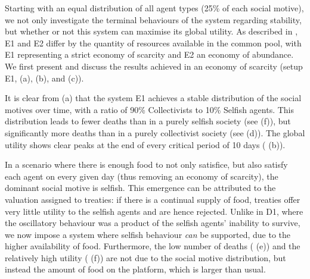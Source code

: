 

Starting with an equal distribution of all agent types (25\% of each social motive), we not only investigate the terminal behaviours of the system regarding stability, but whether or not this system can maximise its global utility. As described in , E1 and E2 differ by the quantity of resources available in the common pool, with E1 representing a strict economy of scarcity and E2 an economy of abundance. We first present and discuss the results achieved in an economy of scarcity (setup E1,  (a), (b), and (c)).

It is clear from  (a) that the system E1 achieves a stable distribution of the social motives over time, with a ratio of 90\% Collectivists to 10\% Selfish agents. This distribution leads to fewer deaths than in a purely selfish society (see  (f)), but significantly more deaths than in a purely collectivist society (see  (d)). The global utility shows clear peaks at the end of every critical period of 10 days ( (b)).

In a scenario where there is enough food to not only satisfice, but also satisfy each agent on every given day (thus removing an economy of scarcity), the dominant social motive is selfish. This emergence can be attributed to the valuation assigned to treaties: if there is a continual supply of food, treaties offer very little utility to the selfish agents and are hence rejected. Unlike in D1, where the oscillatory behaviour was a product of the selfish agents' inability to survive, we now impose a system where selfish behaviour \textit{can} be supported, due to the higher availability of food. Furthermore, the low number of deaths ( (e)) and the relatively high utility ( (f)) are not due to the social motive distribution, but instead the amount of food on the platform, which is larger than usual.

